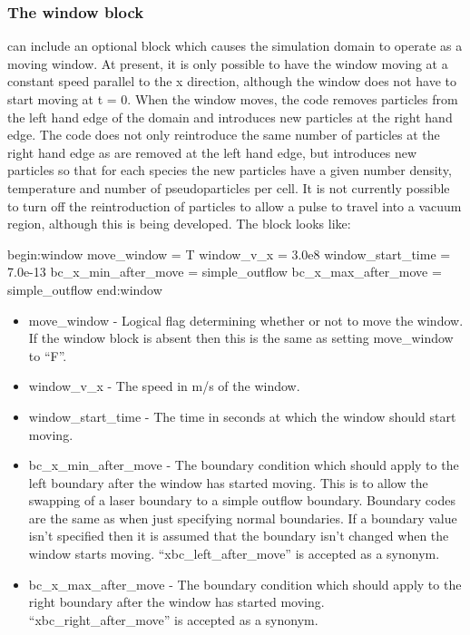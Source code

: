 \subsubsection{The window block}
{\EPOCH} can include an optional block which causes the simulation domain to
operate as a moving window. At present, it is only possible to have the window
moving at a constant speed parallel to the x direction, although the window
does not have to start moving at t = 0. When the window moves, the code removes
particles from the left hand edge of the domain and introduces new particles
at the right hand edge. The code does not only reintroduce the same number of
particles at the right hand edge as are removed at the left hand edge, but
introduces new particles so that for each species the new particles have a
given number density, temperature and number of pseudoparticles per cell. It
is not currently possible to turn off the reintroduction of particles to allow
a pulse to travel into a vacuum region, although this is being developed. The
block looks like:
\begin{boxverbatim}
begin:window
   move_window = T
   window_v_x = 3.0e8
   window_start_time = 7.0e-13
   bc_x_min_after_move = simple_outflow
   bc_x_max_after_move = simple_outflow
end:window
\end{boxverbatim}

\begin{itemize}
\item move\_window - Logical flag determining whether or not to move the
  window. If the window block is absent then this is the same as setting
  move\_window to ``F''.
\item window\_v\_x - The speed in m/s of the window.
\item window\_start\_time - The time in seconds at which the window should
  start moving.
\item bc\_x\_min\_after\_move - The boundary condition which should apply to
  the left boundary after the window has started moving. This is to allow the
  swapping of a laser boundary to a simple outflow boundary. Boundary codes
  are the same as when just specifying normal boundaries. If a boundary value
  isn't specified then it is assumed that the boundary isn't changed when the
  window starts moving. ``xbc\_left\_after\_move'' is accepted as a synonym.
\item bc\_x\_max\_after\_move - The boundary condition which should apply to
  the right boundary after the window has started moving.
  ``xbc\_right\_after\_move'' is accepted as a synonym.
\end{itemize}

